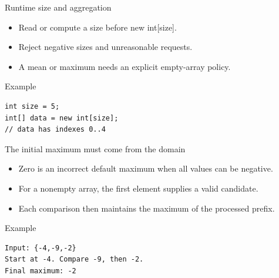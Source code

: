 \documentclass[10pt,aspectratio=169]{beamer}
\begin{document}
\begin{frame}[fragile,t]{Runtime size and aggregation}
\begin{itemize}
\item Read or compute a size before new int[size].
\item Reject negative sizes and unreasonable requests.
\item A mean or maximum needs an explicit empty-array policy.
\end{itemize}
\vspace{1mm}\begin{block}{Example}
\begin{lstlisting}
int size = 5;
int[] data = new int[size];
// data has indexes 0..4
\end{lstlisting}
\end{block}
\end{frame}

\begin{frame}[fragile,t]{The initial maximum must come from the domain}
\begin{itemize}
\item Zero is an incorrect default maximum when all values can be negative.
\item For a nonempty array, the first element supplies a valid candidate.
\item Each comparison then maintains the maximum of the processed prefix.
\end{itemize}
\vspace{1mm}\begin{block}{Example}
\begin{lstlisting}
Input: {-4,-9,-2}
Start at -4. Compare -9, then -2.
Final maximum: -2
\end{lstlisting}
\end{block}
\end{frame}
\end{document}
